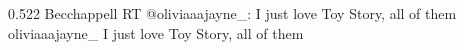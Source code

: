 {0.522}
{\joinNameTweet
{Becchappell}
{RT @oliviaaajayne\_: I just love Toy Story, all of them}}
{\joinNameTweet
{oliviaaajayne\_}
{I just love Toy Story, all of them}}
%
%
%
%
%
%
%
%
%
%
%
%
